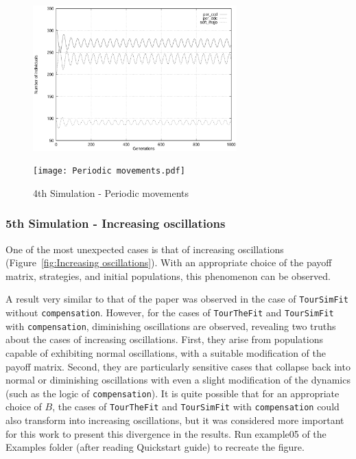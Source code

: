 	\begin{figure}[h]
	    \centering
		\includegraphics[width=0.7\textwidth]{RefPaperFigures/fig4.jpeg}\par\vspace{0.5em}
	    \texttt{[image: Periodic movements.pdf]}
	    \caption{4th Simulation - Periodic movements}
	    \label{fig:Periodic movements}
	\end{figure}
\subsubsection{5th Simulation - Increasing oscillations}
One of the most unexpected cases is that of increasing oscillations (Figure~\ref{fig:Increasing oscillations}). With an appropriate choice of the payoff matrix, strategies, and initial populations, this phenomenon can be observed.

 A result very similar to that of the paper was observed in the case of \texttt{TourSimFit} without \texttt{compensation}. However, for the cases of \texttt{TourTheFit} and \texttt{TourSimFit} with \texttt{compensation}, diminishing oscillations are observed, revealing two truths about the cases of increasing oscillations. First, they arise from populations capable of exhibiting normal oscillations, with a suitable modification of the payoff matrix. Second, they are particularly sensitive cases that collapse back into normal or diminishing oscillations with even a slight modification of the dynamics (such as the logic of \texttt{compensation}). It is quite possible that for an appropriate choice of \( B \), the cases of \texttt{TourTheFit} and \texttt{TourSimFit} with \texttt{compensation} could also transform into increasing oscillations, but it was considered more important for this work to present this divergence in the results. Run example05 of the Examples folder (after reading Quickstart guide) to recreate the figure.

